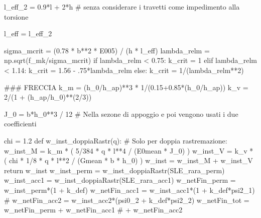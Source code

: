 \begin{pycode}[TraveDoppiaRastremazione]
l_eff_2 = 0.9*l + 2*h # senza considerare i travetti come impedimento alla torsione

l_eff = l_eff_2

sigma_mcrit = (0.78 * b**2 * E005) / (h * l_eff) 
lambda_relm = np.sqrt(f_mk/sigma_mcrit)
if lambda_relm < 0.75:
    k_crit = 1
elif lambda_relm < 1.14:
    k_crit = 1.56 - .75*lambda_relm
else:
    k_crit = 1/(lambda_relm**2)

### FRECCIA
k_m = (h_0/h_ap)**3 * 1/(0.15+0.85*(h_0/h_ap))
k_v = 2/(1 + (h_ap/h_0)**(2/3))

J_0 = b*h_0**3 / 12 # Nella sezone di appoggio e poi vengono usati i due coefficienti

chi = 1.2
def w_inst_doppiaRastr(q): # Solo per doppia rastremazione:
    w_inst_M = k_m * ( 5/384 * q * l**4 / (E0mean * J_0) )
    w_inst_V = k_v * ( chi * 1/8 * q * l**2 / (Gmean * b * h_0) )
    w_inst = w_inst_M + w_inst_V
    return w_inst
w_inst_perm = w_inst_doppiaRastr(SLE_rara_perm)
w_inst_acc1 = w_inst_doppiaRastr(SLE_rara_acc1)
w_netFin_perm = w_inst_perm*(1 + k_def)
w_netFin_acc1 = w_inst_acc1*(1 + k_def*psi2_1)
# w_netFin_acc2 = w_inst_acc2*(psi0_2 + k_def*psi2_2)
w_netFin_tot = w_netFin_perm + w_netFin_acc1 # + w_netFin_acc2

\end{pycode}

